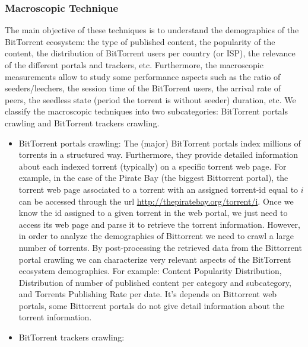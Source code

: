\subsubsection{Macroscopic Technique}
The main objective of these techniques is to understand the demographics of the BitTorrent ecosystem: the type of published content, the popularity of the content, the distribution of BitTorrent users per country (or ISP), the relevance of the different portals and trackers, etc. 
Furthermore, the macroscopic measurements allow to study some performance aspects such as the ratio of seeders/leechers, the session time of the BitTorrent users, the arrival rate of peers, the seedless state (period the torrent is without seeder) duration, etc.
We classify the macroscopic techniques into two subcategories: BitTorrent portals crawling and BitTorrent trackers crawling.
\begin{itemize}
\item BitTorrent portals crawling: 
The (major) BitTorrent portals index millions of torrents in a structured way. 
Furthermore, they provide detailed information about each indexed torrent (typically) on a specific torrent web page. 
For example, in the case of the Pirate Bay (the biggest Bittorrent portal), the torrent web page associated to a torrent with an assigned torrent-id equal to $i$ can be accessed through the url \url{http://thepiratebay.org/torrent/i}.
Once we know the id assigned to a given torrent in the web portal, we just need to access its web page and parse it to retrieve the torrent information. 
However, in order to analyze the demographics of Bittorrent we need to crawl a large number of torrents. 
By post-processing the retrieved data from the Bittorrent portal crawling we can characterize very relevant aspects of the BitTorrent ecosystem demographics. 
For example:  Content Popularity Distribution, Distribution of number of published content per category and subcategory, and Torrents Publishing Rate per date.
It's depends on Bittorrent web portals, some Bittorrent portals do not give detail information about the torrent information. 


\item BitTorrent trackers crawling:



\end{itemize}




